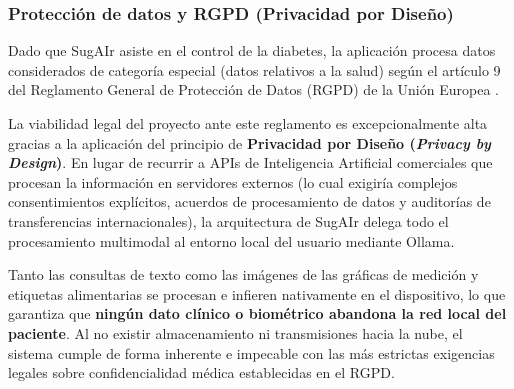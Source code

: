 \subsubsection*{Protección de datos y RGPD (Privacidad por Diseño)}
Dado que SugAIr asiste en el control de la diabetes, la aplicación procesa datos considerados de categoría especial (datos relativos a la salud) según el artículo 9 del Reglamento General de Protección de Datos (RGPD) de la Unión Europea \cite{rgpd_ue}.

La viabilidad legal del proyecto ante este reglamento es excepcionalmente alta gracias a la aplicación del principio de \textbf{Privacidad por Diseño (\textit{Privacy by Design})}. En lugar de recurrir a APIs de Inteligencia Artificial comerciales que procesan la información en servidores externos (lo cual exigiría complejos consentimientos explícitos, acuerdos de procesamiento de datos y auditorías de transferencias internacionales), la arquitectura de SugAIr delega todo el procesamiento multimodal al entorno local del usuario mediante Ollama.

Tanto las consultas de texto como las imágenes de las gráficas de medición y etiquetas alimentarias se procesan e infieren nativamente en el dispositivo, lo que garantiza que \textbf{ningún dato clínico o biométrico abandona la red local del paciente}. Al no existir almacenamiento ni transmisiones hacia la nube, el sistema cumple de forma inherente e impecable con las más estrictas exigencias legales sobre confidencialidad médica establecidas en el RGPD.